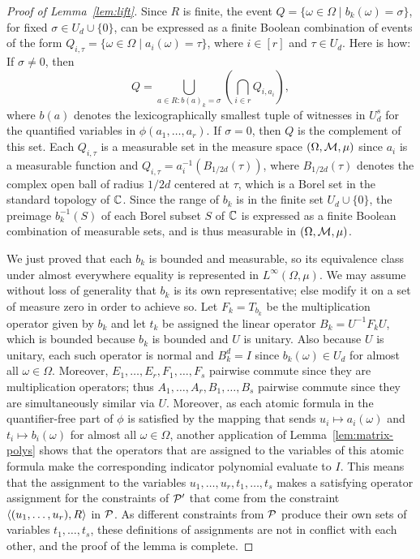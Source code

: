 \documentclass[11pt,letter]{article}
\begin{document}
\begin{proof}[Proof of Lemma~\ref{lem:lift}]
Since $R$ is finite, the event $Q = \{\omega\in\Omega\mid b_k(\omega) =\sigma\}$, for fixed $\sigma\in U_d\cup\{0\}$, can be expressed as a finite Boolean
combination of events of the form $Q_{i,\tau} = \{\omega\in\Omega\mid a_i(\omega) = \tau\}$, where $i\in[r]$ and $\tau\in U_d$. Here is how: If $\sigma\ne0$, then
\[
Q=\bigcup_{a\in R:b(a)_k=\sigma}\left(\bigcap_{i\in r} Q_{i,a_i}\right),
\]
where $b(a)$ denotes the lexicographically smallest tuple of witnesses in $U_d^s$ for the quantified variables in $\phi(a_1,\dots,a_r)$. If $\sigma = 0$, then $Q$ is the complement of this set. Each $Q_{i,\tau}$ is a measurable set in the measure space $(\Omega,{\mathcal M},\mu)$ since
$a_i$ is a measurable function and $Q_{i,\tau} = a^{-1}_i(B_{1/2d}(\tau))$, where $B_{1/2d}(\tau)$ denotes the complex open ball of radius $1/2d$ centered
at $\tau$, which is a Borel set in the standard topology of ${\mathbb C}$. Since the range of $b_k$ is in the finite set $U_d\cup\{0\}$, the preimage
$b^{-1}_k(S)$ of each Borel subset $S$ of ${\mathbb C}$ is expressed as a finite Boolean combination of measurable sets, and is thus measurable
in $(\Omega,{\mathcal M},\mu)$.

We just proved that each $b_k$ is bounded and measurable, so its equivalence class under almost everywhere equality
is represented in $L^\infty(\Omega,\mu)$. We may assume without loss of generality that $b_k$ is its own representative; else modify it
on a set of measure zero in order to achieve so. Let $F_k = T_{b_k}$ be the multiplication operator given by $b_k$ and let $t_k$ be
assigned the linear operator $B_k = U^{-1} F_kU$, which is bounded because $b_k$ is bounded and $U$ is unitary. Also because $U$
is unitary, each such operator is normal and $B_k^d=I$ since $b_k(\omega)\in U_d$ for almost all $\omega\in\Omega$. Moreover, $E_1,\dots, E_r, F_1,\dots, F_s$ pairwise commute since they are multiplication operators; thus $A_1,\dots, A_r, B_1,\dots, B_s$ pairwise
commute since they are simultaneously similar via $U$. Moreover, as each atomic formula in the quantifier-free part of $\phi$
is satisfied by the mapping that sends $u_i\mapsto a_i(\omega)$ and $t_i\mapsto b_i(\omega)$ for almost all $\omega\in\Omega$, another application of Lemma~\ref{lem:matrix-polys}
shows that the operators that are assigned to the variables of this atomic formula make the corresponding indicator polynomial evaluate to $I$. This means that the assignment to the variables $u_1,\dots, u_r,t_1,\dots,t_s$ makes a satisfying operator assignment for
the constraints of ${\mathcal P}'$ that come from the constraint $\langle (u_1,\dots, u_r), R \rangle$ in ${\mathcal P}$. As different constraints from ${\mathcal P}$ produce their own sets of
variables $t_1,\dots,t_s$, these definitions of assignments are not in conflict with each other, and the proof of the lemma is complete.


\end{proof}
\end{document}
